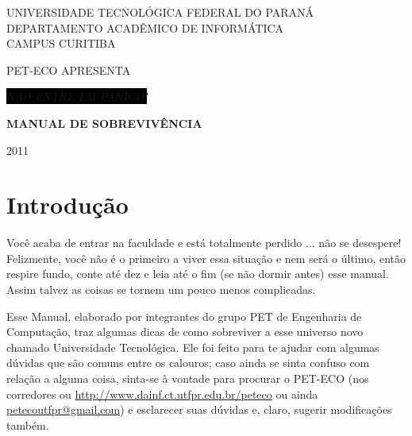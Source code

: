\documentclass[a4paper,12pt,openany]{article}
\newcommand\BackgroundPic{
\put(0,0){
\parbox[b][\paperheight]{\paperwidth}{
\vfill
\centering
\texttt{[image: Grito\_PB.jpg]}
\vfill
}}}
\begin{document}
	\begin{titlepage}
	
	\AddToShipoutPicture*{\BackgroundPic}

        \begin{center}
            UNIVERSIDADE TECNOLÓGICA FEDERAL DO PARANÁ\\
            DEPARTAMENTO ACADÊMICO DE INFORMÁTICA\\
            CAMPUS CURITIBA
          
            \vspace{2cm}
            
            PET-ECO APRESENTA

            \vfill

            {\Huge \emph{\colorbox{black}{\color{red} NÃO ENTRE EM PÂNICO!}} }
            

            \vspace{13cm}
            
            {\LARGE \textbf{\color{blue} MANUAL DE SOBREVIVÊNCIA} }

            \vfill
            
            2011
        \end{center}

	\end{titlepage}

\thispagestyle{empty}
\tableofcontents

\newpage
\section{Introdução}

Você acaba de entrar na faculdade e está totalmente perdido  ... não se desespere! Felizmente, você não é o primeiro a viver essa situação e nem será o último, então respire fundo, conte até dez e leia até o fim (se não dormir antes) esse manual. Assim talvez as coisas se tornem um pouco menos complicadas. 

Esse Manual, elaborado por integrantes do grupo PET de Engenharia de Computação, traz algumas dicas de como sobreviver a esse universo novo chamado Universidade Tecnológica. Ele foi feito para te ajudar com algumas dúvidas que são comuns entre os calouros; caso ainda se sinta confuso com relação a alguma coisa, sinta-se à vontade para procurar o PET-ECO (nos corredores ou \url{http://www.dainf.ct.utfpr.edu.br/peteco} ou ainda \href{mailto:petecoutfpr@gmail.com}{petecoutfpr@gmail.com}) e esclarecer suas dúvidas e, claro, sugerir modificações também.
\end{document}
